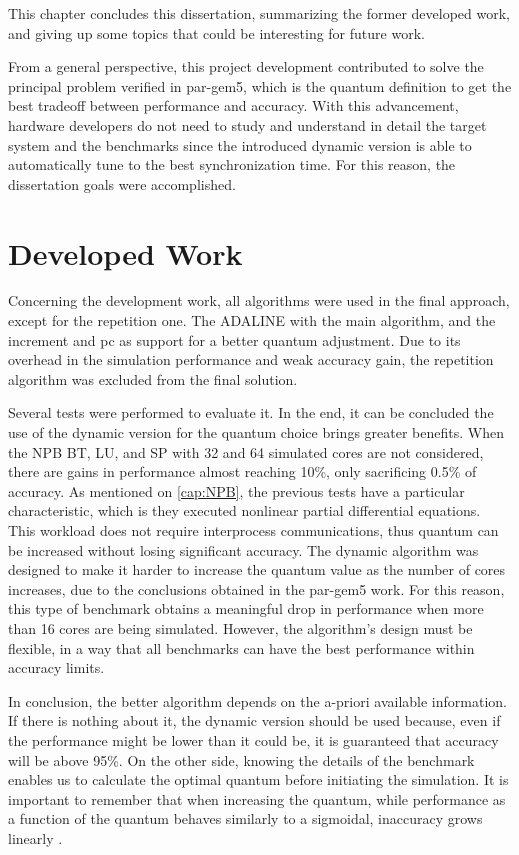 

This chapter concludes this dissertation, summarizing the former developed work, and giving up some topics that could be
interesting for future work.

From a general perspective, this project development contributed to solve the principal problem verified in par-gem5, which is the 
quantum definition to get the best tradeoff between performance and accuracy. With this advancement, hardware developers do not 
need to study and understand in detail the target system and the benchmarks since the introduced dynamic version is able to 
automatically tune to the best synchronization time. For this reason, the dissertation goals were accomplished. 

\section{Developed Work}

Concerning the development work, all algorithms were used in the final approach, except for the repetition one. The ADALINE with 
the main algorithm, and the increment and \gls{pc} as support for a better quantum adjustment. Due to its overhead in the 
simulation performance and weak accuracy gain, the repetition algorithm was excluded from the final solution.


Several tests were performed to evaluate it. In the end, it can be concluded the use of the dynamic version for the quantum choice brings 
greater benefits. When the NPB BT, LU, and SP with 32 and 64 simulated cores are not considered, there are gains in performance almost 
reaching 10\%, only sacrificing 0.5\% of accuracy. As mentioned on \autoref{cap:NPB}, the previous tests have a particular characteristic, 
which is they executed nonlinear partial differential equations. This workload does not require interprocess communications, thus 
quantum can be increased without losing significant accuracy. The dynamic algorithm was designed to make it harder to increase the 
quantum value as the number of cores increases, due to the conclusions obtained in the par-gem5 \cite*{pargem5} work. For this reason, 
this type of benchmark obtains a meaningful drop in performance when more than 16 cores are being simulated. However, the 
algorithm's design must be flexible, in a way that all benchmarks can have the best performance within accuracy limits. 

In conclusion, the better algorithm depends on the a-priori available information. If there is nothing about it, the dynamic version should be 
used because, even if the performance might be lower than it could be, it is guaranteed that accuracy will be above 95\%. On the other side,
knowing the details of the benchmark enables us to calculate the optimal quantum before initiating the simulation. It is important to 
remember that when increasing the quantum, while performance as a function of the quantum behaves similarly to a sigmoidal, inaccuracy 
grows linearly \cite*{BeyondQuantumTDSim}.

